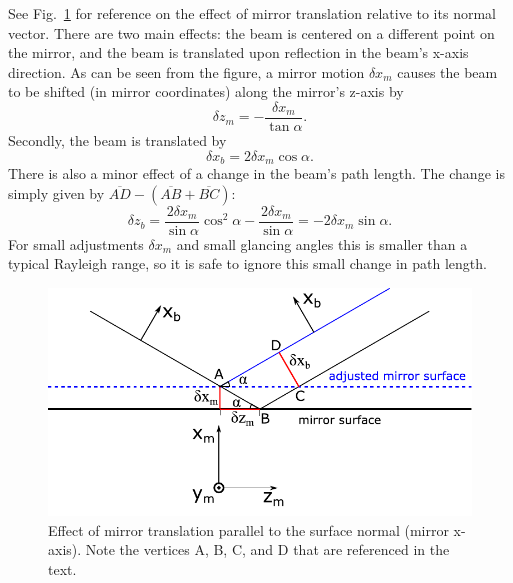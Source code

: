 \documentclass[11pt,fleqn]{article} %
\begin{document}
See Fig.~\ref{fig:mirror_motion} for reference on the effect of mirror translation relative to its normal vector. There are two main effects: the beam is centered on a different point on the mirror, and the beam is translated upon reflection in the beam's x-axis direction. As can be seen from the figure, a mirror motion $\delta x_m$ causes the beam to be shifted (in mirror coordinates) along the mirror's z-axis by
\begin{equation}
\label{delta_z}
\delta z_m = -\frac{\delta x_m}{\tan\alpha}.
\end{equation}
Secondly, the beam is translated by
\begin{equation}
\label{delta_cx}
\delta x_b = 2 \delta x_m \cos\alpha.
\end{equation}
There is also a minor effect of a change in the beam's path length. The change is simply given by $\overline{AD} - (\overline{AB} + \overline{BC})$:
\begin{equation}
\label{path_length}
\delta z_b = \frac{2 \delta x_m}{\sin\alpha} \cos^2\alpha - \frac{2 \delta x_m}{\sin\alpha} = -2 \delta x_m \sin\alpha.
\end{equation}
For small adjustments $\delta x_m$ and small glancing angles this is smaller than a typical Rayleigh range, so it is safe to ignore this small change in path length.

\begin{figure}[htb]
\begin{center}
\includegraphics[width=1.0\textwidth]{Figures/mirror_motion.pdf}
\caption{Effect of mirror translation parallel to the surface normal (mirror x-axis). Note the vertices A, B, C, and D that are referenced in the text.}
\label{fig:mirror_motion}
\end{center}
\end{figure}
\end{document}
